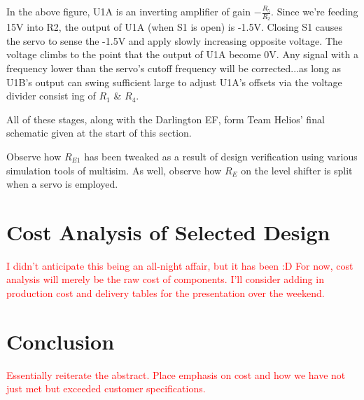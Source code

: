 \documentclass[journal]{IEEEtran}
\begin{document}
In the above figure, U1A is an inverting amplifier of gain $-\frac{R_{5}}{R_{2}}$. Since we’re feeding 15V into R2, 
the output of U1A (when S1 is open) is -1.5V. Closing S1 causes the servo to sense the -1.5V and apply
slowly increasing opposite voltage. The voltage climbs to the point that the output of U1A become
0V. Any signal with a frequency lower than the servo’s cutoff frequency will be corrected...as long
as U1B’s output can swing sufficient large to adjust U1A’s offsets via the voltage divider consist
ing of $R_{1}$ \& $R_{4}$.

All of these stages, along with the Darlington EF, form Team Helios' final schematic given at the
start of this section.

Observe how $R_{E1}$ has been tweaked as a result of design verification using various simulation tools of
multisim. As well, observe how $R_{E}$ on the level shifter is split when a servo is employed.

\section{Cost Analysis of Selected Design}

\textcolor{red}{I didn't anticipate this being an all-night affair, but it has been :D For now, cost analysis will merely be the raw cost of components. I'll consider adding in production cost and delivery tables for the presentation over the weekend.}

\section{Conclusion}

\textcolor{red}{Essentially reiterate the abstract. Place emphasis on cost and how we have not just met but exceeded customer specifications.}

\end{document}
